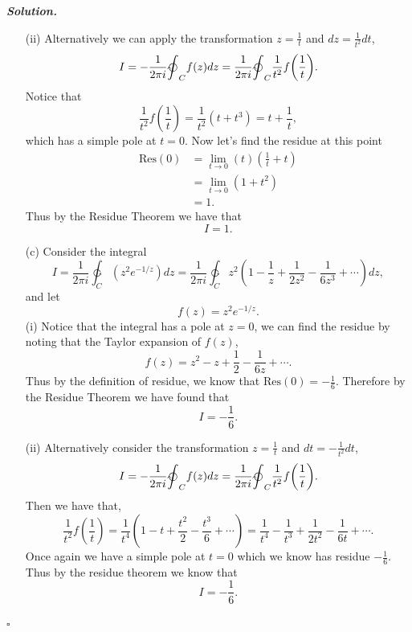 \documentclass[12pt]{report}
\newenvironment{solution}[1][\it{Solution}]{\textbf{#1. } }{$\square$}
\newcommand{\paren}[1]{{\left(#1\right)}} %
\def\ointcc{{\ointctrclockwise}} %
\def\ointc{{\ointclockwise}} %
\begin{document}
\begin{solution}
\begin{enumerate}
        \noindent
        (ii) Alternatively we can apply the transformation $z = \frac{1}{t}$ and $dz = \frac{1}{t^2}dt$,
        \[ I = -\frac{1}{2\pi i} \ointc_C f(z) dz = \frac{1}{2\pi i} \ointc_C \frac{1}{t^2}f\paren{\frac{1}{t}}. \]
        Notice that
        \[ \frac{1}{t^2}f\paren{\frac{1}{t}} = \frac{1}{t^2}(t + t^3) = t + \frac{1}{t},\]
        which has a simple pole at $t = 0$. Now let's find the residue at this point
        \begin{align*}
            \text{Res}(0) &= \lim_{t \to 0}(t)(\frac{1}{t} + t)\\
            &= \lim_{t \to 0} (1 + t^2)\\
            &= 1.
        \end{align*}
        Thus by the Residue Theorem we have that
        \[ I = 1.\]
        \item [(c)]
        Consider the integral
        \[ 
            I = \frac{1}{2\pi i} \ointcc_C (z^2e^{-1/z})dz = \frac{1}{2\pi i} \ointcc_C z^2(1 - \frac{1}{z} + \frac{1}{2z^2} - \frac{1}{6z^3} + \cdots)dz,
        \]
        and let
        \[ f(z) = z^2e^{-1/z}.\]
        \noindent
        (i) Notice that the integral has a pole at $z = 0$, we can find the residue by noting that the Taylor expansion of $f(z)$,
        \[ f(z) = z^2 - z + \frac{1}{2} - \frac{1}{6z} + \cdots .\]
        Thus by the definition of residue, we know that $\text{Res}(0) = - \frac{1}{6}.$ Therefore by the Residue Theorem we have found that
        \[ I = - \frac{1}{6}.\] 

        \noindent
        (ii)
        Alternatively consider the transformation $z = \frac{1}{t}$ and $dt = - \frac{1}{t^2}dt$,
        \[ I = -\frac{1}{2\pi i} \ointc_C f(z) dz = \frac{1}{2\pi i} \ointc_C \frac{1}{t^2}f\paren{\frac{1}{t}}. \]
        Then we have that,
        \[ \frac{1}{t^2}f\paren{\frac{1}{t}} = \frac{1}{t^4}(1 - t + \frac{t^2}{2} - \frac{t^3}{6} + \cdots ) = \frac{1}{t^4} - \frac{1}{t^3} + \frac{1}{2t^2} - \frac{1}{6t} + \cdots.\]
        Once again we have a simple pole at $t = 0$ which we know has residue $- \frac{1}{6}.$ Thus by the residue theorem we know that
        \[ I = - \frac{1}{6}.\]

    \end{enumerate}
\end{solution}

\newpage

\end{document}
